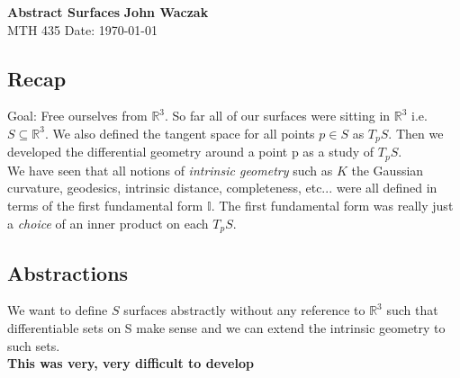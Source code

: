 \documentclass[a4paper, 11pt]{article}
\begin{document}
\noindent
\large\textbf{Abstract Surfaces} \hfill \textbf{John Waczak} \\
\normalsize MTH 435 \hfill  Date: \today \\


	
	
\subsection*{Recap} 
	Goal: Free ourselves from $\mathbb{R}^3$. So far all of our surfaces were sitting in $\mathbb{R}^3$ i.e. $S\subseteq\mathbb{R}^3$. We also defined the tangent space for all points $p\in S$ as $T_p S$. Then we developed the differential geometry around a point p as a study of $T_p S$. \\ 
	
	\noindent We have seen that all notions of \textit{intrinsic geometry} such as $K$ the Gaussian curvature, geodesics, intrinsic distance, completeness, etc... were all defined in terms of the first fundamental form $\mathbb{I}$. The first fundamental form was really just a \textit{choice} of an inner product on each $T_p S$. 

\subsection*{Abstractions} 
	We want to define $S$ surfaces abstractly without any reference to $\mathbb{R}^3$ such that differentiable sets on S make sense and we can extend the intrinsic geometry to such sets. \\ 
	
	\textbf{This was very, very difficult to develop} \\ 
\end{document}

